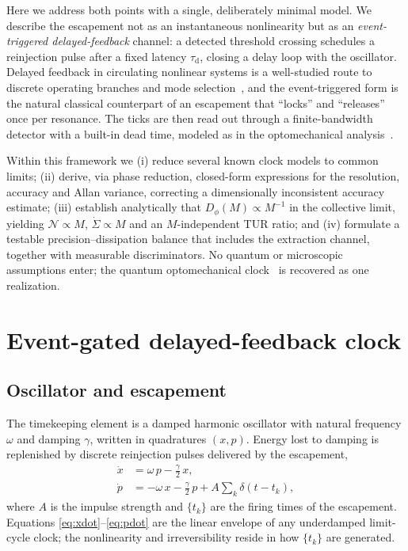 \documentclass[aps,pre,reprint,amsmath,amssymb,floatfix,nofootinbib]{revtex4-2}
\newcommand{\Sdot}{\dot{\Sigma}}
\newcommand{\Dphi}{D_{\phi}}
\newcommand{\taud}{\tau_{\mathrm{d}}}
\begin{document}
Here we address both points with a single, deliberately minimal model.
We describe the escapement not as an instantaneous nonlinearity but as an
\emph{event-triggered delayed-feedback} channel: a detected threshold
crossing schedules a reinjection pulse after a fixed latency $\taud$,
closing a delay loop with the oscillator. Delayed feedback in
circulating nonlinear systems is a well-studied route to discrete
operating branches and mode selection~\cite{GiacomelliPoliti1996,YanchukGiacomelli2017},
and the event-triggered form is the natural classical counterpart of an
escapement that ``locks'' and ``releases'' once per resonance. The
ticks are then read out through a finite-bandwidth detector with a
built-in dead time, modeled as in the optomechanical
analysis~\cite{Brunelli2026,WisemanMilburn2009}.

Within this framework we (i) reduce several known clock models to common
limits; (ii) derive, via phase reduction, closed-form expressions for
the resolution, accuracy and Allan variance, correcting a dimensionally
inconsistent accuracy estimate; (iii) establish analytically that
$\Dphi(M)\propto M^{-1}$ in the collective limit, yielding
$\mathcal{N}\propto M$, $\Sdot\propto M$ and an $M$-independent TUR
ratio; and (iv) formulate a testable precision--dissipation balance that
includes the extraction channel, together with measurable
discriminators. No quantum or microscopic assumptions enter; the
quantum optomechanical clock~\cite{Brunelli2026} is recovered as one
realization.

\section{Event-gated delayed-feedback clock}
\label{sec:model}

\subsection{Oscillator and escapement}

The timekeeping element is a damped harmonic oscillator with natural
frequency $\omega$ and damping $\gamma$, written in quadratures
$(x,p)$. Energy lost to damping is replenished by discrete reinjection
pulses delivered by the escapement,
\begin{align}
  \dot{x} &= \omega\,p - \tfrac{\gamma}{2}\,x , \label{eq:xdot}\\
  \dot{p} &= -\omega\,x - \tfrac{\gamma}{2}\,p
            + A\sum_{k} \delta\!\left(t-t_k\right) , \label{eq:pdot}
\end{align}
where $A$ is the impulse strength and $\{t_k\}$ are the firing times of
the escapement. Equations \eqref{eq:xdot}--\eqref{eq:pdot} are the
linear envelope of any underdamped limit-cycle clock; the nonlinearity
and irreversibility reside in how $\{t_k\}$ are generated.
\end{document}
